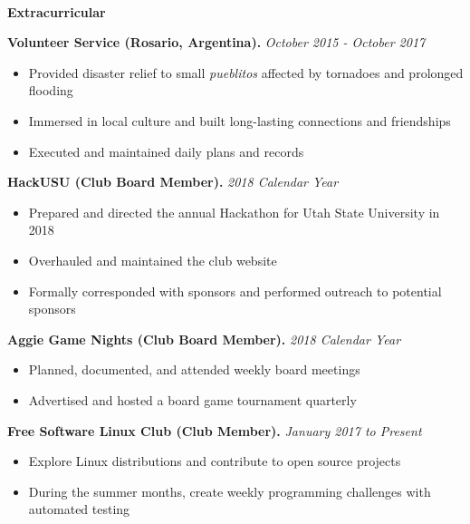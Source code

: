 \documentclass[letterpaper,11pt]{article}
\begin{document}

\begin{Large}\textbf{\\Extracurricular}\end{Large}

\textbf{Volunteer Service (Rosario, Argentina).} \textit{October 2015 - October 2017}
\begin{itemize}[noitemsep,topsep=0pt]
	\item Provided disaster relief to small \textit{pueblitos} affected by tornadoes and prolonged flooding
	\item Immersed in local culture and built long-lasting connections and friendships
	\item Executed and maintained daily plans and records\\
\end{itemize}

\textbf{HackUSU (Club Board Member).} \textit{2018 Calendar Year}
\begin{itemize}[noitemsep,topsep=0pt]
	\item Prepared and directed the annual Hackathon for Utah State University in 2018
	\item Overhauled and maintained the club website
	\item Formally corresponded with sponsors and performed outreach to potential sponsors\\
\end{itemize}

\textbf{Aggie Game Nights (Club Board Member).} \textit{2018 Calendar Year}
\begin{itemize}[noitemsep,topsep=0pt]
	\item Planned, documented, and attended weekly board meetings
	\item Advertised and hosted a board game tournament quarterly\\
\end{itemize}

\textbf{Free Software Linux Club (Club Member).} \textit{January 2017 to Present}
\begin{itemize}[noitemsep,topsep=0pt]
	\item Explore Linux distributions and contribute to open source projects
	\item During the summer months, create weekly programming challenges with automated testing\\\\
\end{itemize}
\end{document}

